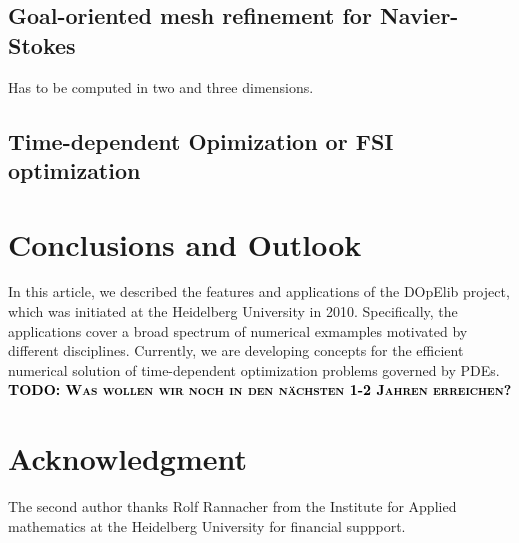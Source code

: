 \documentclass[prodmode,acmtoms]{acmsmall}
\numberwithin{equation}{section}
\newcommand{\todo}[1]{\textbf{\textsc{\textcolor{black}{TODO: #1}}}}
\begin{document}
\subsection{Goal-oriented mesh refinement for Navier-Stokes}
Has to be computed in two and three dimensions.

\subsection{Time-dependent Opimization or FSI optimization}



\section{Conclusions and Outlook}
\label{conclusions}
In this article, we described the features 
and applications of the DOpElib project, which 
was initiated at the Heidelberg University in 2010.
Specifically, the applications cover a broad 
spectrum of numerical exmamples motivated 
by different disciplines. 
Currently, we are developing concepts for the efficient 
numerical solution of time-dependent optimization
problems governed by PDEs. 
\todo{Was wollen wir noch in den nächsten 1-2 Jahren erreichen?}



\section*{Acknowledgment}
The second author thanks Rolf Rannacher from
the Institute for Applied mathematics at the 
Heidelberg University for financial suppport. 




%


%
\end{document}
